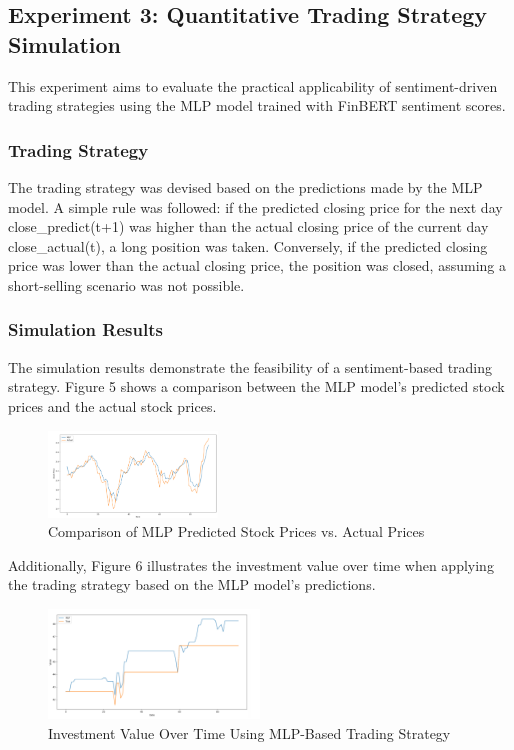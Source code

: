 \documentclass[11pt,a4paper]{article}
\begin{document}
  \subsection{Experiment 3: Quantitative Trading Strategy Simulation}
  \label{sec:experiment3}
  
  This experiment aims to evaluate the practical applicability of sentiment-driven trading strategies using the MLP model trained with FinBERT sentiment scores.
  
  \subsubsection{Trading Strategy}
  The trading strategy was devised based on the predictions made by the MLP model. A simple rule was followed: if the predicted closing price for the next day {close\_predict(t+1)} was higher than the actual closing price of the current day close\_actual(t), a long position was taken. Conversely, if the predicted closing price was lower than the actual closing price, the position was closed, assuming a short-selling scenario was not possible.
  
  \subsubsection{Simulation Results}
  The simulation results demonstrate the feasibility of a sentiment-based trading strategy. Figure 5 shows a comparison between the MLP model's predicted stock prices and the actual stock prices. 
  
  \begin{figure}[ht]
  \centering
  \includegraphics[width=0.4\textwidth]{figs/2023-11-30_143814.jpg}
  \caption{Comparison of MLP Predicted Stock Prices vs. Actual Prices}
  \label{fig:mlp_vs_actual_prices}
  \end{figure}
  
  Additionally, Figure 6 illustrates the investment value over time when applying the trading strategy based on the MLP model's predictions.
  
  \begin{figure}[ht]
  \centering
  \includegraphics[width=0.5\textwidth]{figs/2023-11-30_143820.jpg}
  \caption{Investment Value Over Time Using MLP-Based Trading Strategy}
  \label{fig:trading_strategy_results}
  \end{figure}
  
\end{document}
